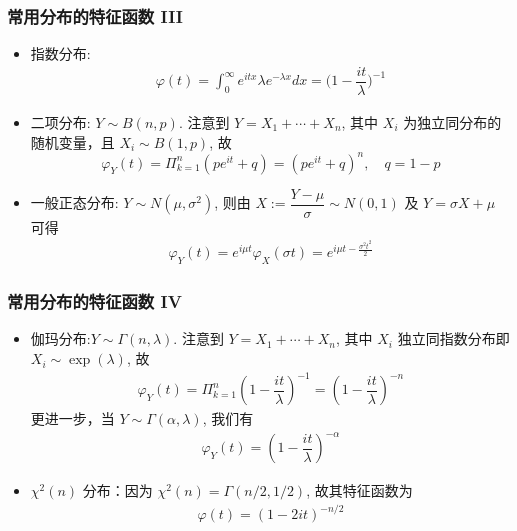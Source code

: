 \begin{frame}%
	\frametitle{常用分布的特征函数  III}
	\begin{itemize}[<+-|alert@+>]
		\item 指数分布:
		\begin{eqnarray*}
			\varphi(t)=\int_0^\infty e^{itx}\lambda e^{-\lambda x}dx=\bigg(1-\dfrac{it}{\lambda}\bigg)^{-1}
		\end{eqnarray*}
		\item 二项分布: $Y\sim B (n,p)$. 注意到 $Y=X_1+\cdots+X_n$, 其中 $X_i$ 为独立同分布的随机变量，且 $X_i\sim B (1,p)$, 故
		\[\varphi_Y(t)=\Pi_{k=1}^n(pe^{it}+q)=(pe^{it}+q)^n, \quad q=1-p\]

		\item 一般正态分布: $Y\sim N (\mu,\sigma^2)$, 则由 $X:=\dfrac{Y-\mu}{\sigma}\sim N (0,1)$ 及 $Y=\sigma X+\mu$ 可得
		\begin{eqnarray*}
			\varphi_Y(t)=e^{i\mu t}\varphi_X(\sigma t)=e^{i\mu t-\frac{\sigma^2t^2}{2}}
		\end{eqnarray*}
	\end{itemize}
\end{frame}
\begin{frame}%
	\frametitle{常用分布的特征函数  IV}
	\begin{itemize}[<+-|alert@+>]
		\item 伽玛分布:$Y\sim \Gamma (n,\lambda)$. 注意到 $Y=X_1+\cdots+X_n$, 其中 $X_i$ 独立同指数分布即 $X_i\sim \exp (\lambda)$, 故
		\begin{eqnarray*}
			\varphi_Y(t)=\Pi_{k=1}^n(1-\dfrac{it}{\lambda})^{-1}=(1-\dfrac{it}{\lambda})^{-n}
		\end{eqnarray*}
		更进一步，当 $Y\sim \Gamma (\alpha,\lambda)$, 我们有
		\begin{eqnarray*}
			\varphi_Y(t)=(1-\dfrac{it}{\lambda})^{-\alpha}
		\end{eqnarray*}
		\item $\chi^2 (n)$ 分布：因为 $\chi^2 (n)=\Gamma (n/2,1/2)$, 故其特征函数为
		\begin{eqnarray*}
			\varphi(t)=(1-2it)^{-n/2}
		\end{eqnarray*}
	\end{itemize}
\end{frame}
